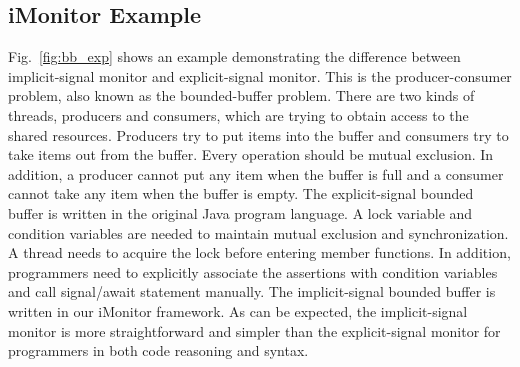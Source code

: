 \documentclass[preprint]{sigplanconf}
\begin{document}
\subsection{iMonitor Example}

Fig.~\ref{fig:bb_exp} shows an example demonstrating the difference between 
implicit-signal monitor and explicit-signal monitor. This is the 
producer-consumer problem, also known as the bounded-buffer problem. 
There are two kinds of threads, producers and consumers, which are 
trying to obtain access to the shared resources. Producers try to put items 
into the buffer and consumers try to take items out from the buffer. Every 
operation should be mutual exclusion. In addition, a producer cannot put any 
item when the buffer is full and a consumer cannot take any item when the 
buffer is empty. The explicit-signal bounded buffer is written in the original 
Java program language. A lock variable and condition variables are
needed to maintain mutual exclusion and synchronization. A thread needs to
acquire the lock before entering member functions. In addition, programmers need
to explicitly associate the assertions with condition variables and call
signal/await statement manually. The implicit-signal bounded buffer is written
in our iMonitor framework. As can be expected, the implicit-signal monitor is
more straightforward and simpler than the explicit-signal monitor for
programmers in both code reasoning and syntax. 
\end{document}
